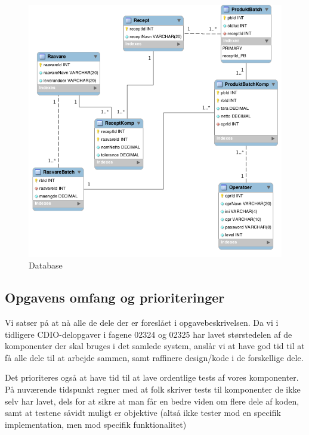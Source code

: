 \documentclass[a4paper]{article}
\begin{document}
\begin{figure}[H]
  \centering
  \includegraphics[scale=0.6]{graphics/db.png}
    \caption{Database}
\end{figure}


\subsection{Opgavens omfang og prioriteringer} %
\label{sub:Opgavens omfang og prioriteringer}

Vi satser på at nå alle de dele der er foreslået i opgavebeskrivelsen. Da vi i tidligere CDIO-delopgaver i fagene 02324 og 02325 har lavet størstedelen af de komponenter der skal bruges i det samlede system, anslår vi at have god tid til at få alle dele til at arbejde sammen, samt raffinere design/kode i de forskellige dele.

Det prioriteres også at have tid til at lave ordentlige tests af vores komponenter. På nuværende tidspunkt regner med at folk skriver tests til komponenter de ikke selv har lavet, dels for at sikre at man får en bedre viden om flere dele af koden, samt at testene såvidt muligt er objektive (altså ikke tester mod en specifik implementation, men mod specifik funktionalitet)
\end{document}
